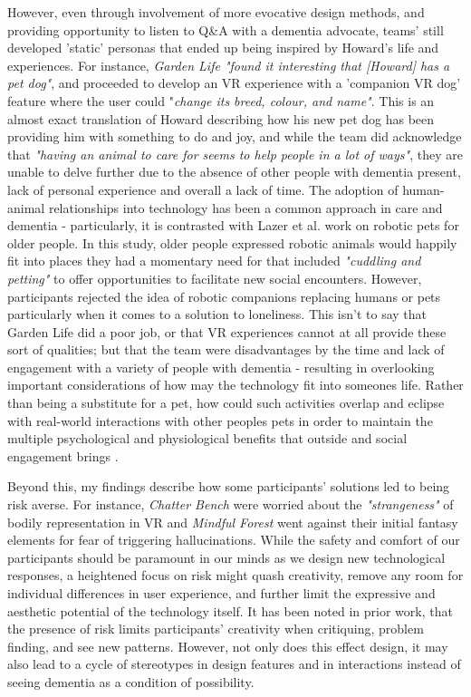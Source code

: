 However, even through involvement of more evocative design methods, and providing opportunity to listen to Q\&A with a dementia advocate, teams' still developed 'static' personas that ended up being inspired by Howard's life and experiences. For instance, \textit{Garden Life "found it interesting that [Howard] has a pet dog"}, and proceeded to develop an VR experience with a 'companion VR dog' feature  where the user could "\textit{change its breed, colour, and name"}. This is an almost exact translation of Howard describing how his new pet  dog has been providing him with something to do and joy, and while the team did acknowledge that \textit{"having an animal to care for seems to help people in a lot of ways"}, they are unable to delve further  due to  the absence of other people with dementia present, lack of personal experience and overall a lack  of time. The adoption of  human-animal relationships into technology has been a common approach in care and dementia - particularly, it is contrasted with Lazer et al. \citep{lazar_rethinking_2016} work on robotic pets for older people. In this study, older people expressed robotic animals would  happily fit into places they had a momentary need for that included \textit{"cuddling and petting"} to offer opportunities to facilitate new social encounters. However, participants rejected the idea of robotic companions replacing humans or pets particularly when it comes to a solution to loneliness. This isn't to say that Garden Life did a poor job, or that VR experiences cannot at all provide these sort of qualities; but that the team were  disadvantages by the time and lack of engagement with a variety of people with dementia - resulting in overlooking important considerations of how may the technology fit into someones life. Rather than being a substitute for a pet, how could such activities overlap and eclipse with real-world interactions with other peoples pets in order to maintain the multiple psychological and physiological benefits that outside and social engagement brings \citep{gilliard_transforming_2011}.

Beyond this, my findings describe how some participants' solutions led to being risk averse. For instance, \textit{Chatter Bench} were worried about the \textit{"strangeness"} of bodily representation in VR and \textit{Mindful Forest} went against their initial fantasy elements for fear of triggering hallucinations. While the safety and comfort of our participants should be paramount in our minds as we  design new technological responses, a heightened focus on risk might quash  creativity, remove any room for individual differences in user experience, and further limit the expressive and aesthetic potential of the technology itself. It has been noted in prior work, that the presence of risk limits participants' creativity when critiquing, problem finding, and see new patterns. However, not only does this effect design, it may also lead to a cycle of stereotypes in design features and in interactions instead of seeing dementia as a condition of possibility. 





